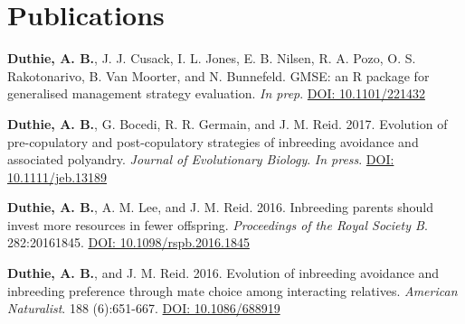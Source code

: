 \documentclass[letterpaper]{article}
\begin{document}
\section*{Publications}
\begin{etaremune}
\item {\bf Duthie, A. B.}, J. J. Cusack, I. L. Jones, E. B. Nilsen, R. A. Pozo, O. S. Rakotonarivo, B. Van Moorter, and N. Bunnefeld. GMSE: an R package for generalised management strategy evaluation. {\it In prep}. \href{https://www.biorxiv.org/content/early/2017/11/17/221432}{DOI: 10.1101/221432} %
\item {\bf Duthie, A. B.}, G. Bocedi, R. R. Germain, and J. M. Reid. 2017. Evolution of pre-copulatory and post-copulatory strategies of inbreeding avoidance and associated polyandry. {\it Journal of Evolutionary Biology}. {\it In press}. \href{https://onlinelibrary.wiley.com/doi/10.1111/jeb.13189/full}{DOI: 10.1111/jeb.13189}
\item {\bf Duthie, A. B.}, A. M. Lee, and J. M. Reid. 2016. Inbreeding parents should invest more resources in fewer offspring. {\it Proceedings of the Royal Society B}. 282:20161845. \href{http://rspb.royalsocietypublishing.org/content/283/1843/20161845}{DOI: 10.1098/rspb.2016.1845}
\item {\bf Duthie, A. B.}, and J. M. Reid. 2016. Evolution of inbreeding avoidance and inbreeding preference through mate choice among interacting relatives. {\it American Naturalist}. 188 (6):651-667. \href{http://www.journals.uchicago.edu/doi/full/10.1086/688919}{DOI: 10.1086/688919}

\end{etaremune}
\end{document}
